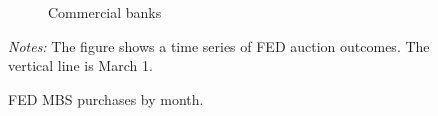 \documentclass[11pt,a4paper]{article}
\begin{document}
\begin{figure}[h]
\begin{subfigure}[b]{0.7\textwidth}
        \caption{ Commercial banks } 
       \end{subfigure}
       \caption{FED MBS purchases by month.}\label{fig:fed_mbs_amount_by_month}
     \begin{minipage}{\textwidth}
        \footnotesize{\textit{Notes:} The figure shows a time series of FED auction outcomes. The vertical line is March 1.  } 
        \end{minipage}
  \end{figure}



\pagebreak
\end{document}
